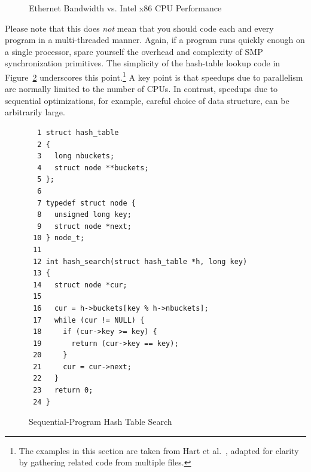 \begin{figure}[htb]
\begin{center}
\end{center}
\caption{Ethernet Bandwidth vs. Intel x86 CPU Performance}
\label{fig:SMPdesign:Ethernet Bandwidth vs. Intel x86 CPU Performance}
\end{figure}

Please note that this does \emph{not} mean that you should code each
and every program in a multi-threaded manner.
Again, if a program runs quickly enough on a single processor,
spare yourself the overhead and complexity of SMP synchronization
primitives.
The simplicity of the hash-table lookup code in
Figure~\ref{fig:SMPdesign:Sequential-Program Hash Table Search}
underscores this point.\footnote{
	The examples in this section are taken from Hart et
	al.~\cite{ThomasEHart2006a}, adapted for clarity
	by gathering related code from multiple files.}
A key point is that speedups due to parallelism are normally
limited to the number of CPUs.
In contrast, speedups due to sequential optimizations, for example,
careful choice of data structure, can be arbitrarily large.

\begin{figure}[htbp]
{ \scriptsize
\begin{verbatim}
  1 struct hash_table
  2 {
  3   long nbuckets;
  4   struct node **buckets;
  5 };
  6
  7 typedef struct node {
  8   unsigned long key;
  9   struct node *next;
 10 } node_t;
 11
 12 int hash_search(struct hash_table *h, long key)
 13 {
 14   struct node *cur;
 15
 16   cur = h->buckets[key % h->nbuckets];
 17   while (cur != NULL) {
 18     if (cur->key >= key) {
 19       return (cur->key == key);
 20     }
 21     cur = cur->next;
 22   }
 23   return 0;
 24 }
\end{verbatim}
}
\caption{Sequential-Program Hash Table Search}
\label{fig:SMPdesign:Sequential-Program Hash Table Search}
\end{figure}

